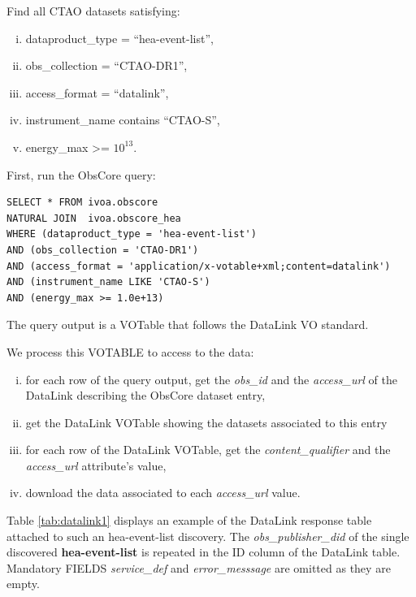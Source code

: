 \medskip
\noindent Find all CTAO datasets satisfying:
\begin{enumerate}[(i)]
  \item dataproduct\_type = ``hea-event-list'',
  \item obs\_collection = ``CTAO-DR1'',
  \item access\_format = ``datalink'',
  \item instrument\_name contains ``CTAO-S'',
  \item energy\_max >= $10^{13}$.
\end{enumerate}

First, run the ObsCore query:
\begin{verbatim}
SELECT * FROM ivoa.obscore
NATURAL JOIN  ivoa.obscore_hea
WHERE (dataproduct_type = 'hea-event-list')
AND (obs_collection = 'CTAO-DR1')
AND (access_format = 'application/x-votable+xml;content=datalink')
AND (instrument_name LIKE 'CTAO-S')
AND (energy_max >= 1.0e+13)
\end{verbatim}

The query output is a VOTable that follows the DataLink VO standard.

We process this VOTABLE to access to the data:
\begin{enumerate}[(i)]
  \item for each row of the query output, get the {\em obs\_id\/} and the {\em access\_url\/} of the DataLink describing the ObsCore dataset entry,
  \item get the DataLink VOTable showing the datasets associated to this entry
  \item for each row of the DataLink VOTable, get the {\em content\_qualifier\/} and the {\em access\_url\/} attribute's value,
  \item download the data associated to each {\em access\_url\/} value.
\end{enumerate}


Table \ref{tab:datalink1} displays an example of the DataLink response table attached to such an hea-event-list discovery.
The {\em obs\_publisher\_did\/} of the single discovered {\bf hea-event-list} is repeated in the ID column of the DataLink table.
Mandatory FIELDS {\em service\_def\/} and {\em error\_messsage\/} are omitted as they are empty.

